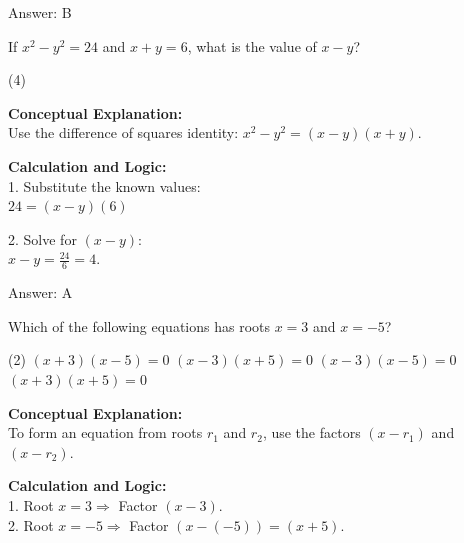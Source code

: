 \documentclass[11pt,paper=a4,answers]{exam}
\begin{document}
\begin{questions}
\begin{solution}
\vspace{20pt}

Answer: \colorbox{yellow!100}{B}
\end{solution}

\vspace{30pt}

\question
If $x^2 - y^2 = 24$ and $x + y = 6$, what is the value of $x - y$?
\begin{tasks}(4)
\end{tasks}

\begin{solution}
\textbf{Conceptual Explanation:} \\
Use the difference of squares identity: $x^2 - y^2 = (x - y)(x + y)$.

\vspace{15pt}

\textbf{Calculation and Logic:} \\
1. Substitute the known values: \\
   $24 = (x - y)(6)$

\vspace{10pt}

2. Solve for $(x - y)$: \\
   $x - y = \frac{24}{6} = 4$.

\vspace{20pt}

Answer: \colorbox{yellow!100}{A}
\end{solution}

\vspace{30pt}

\question
Which of the following equations has roots $x = 3$ and $x = -5$?
\begin{tasks}(2)
    \task $(x + 3)(x - 5) = 0$
    \task $(x - 3)(x + 5) = 0$
    \task $(x - 3)(x - 5) = 0$
    \task $(x + 3)(x + 5) = 0$
\end{tasks}

\begin{solution}
\textbf{Conceptual Explanation:} \\
To form an equation from roots $r_1$ and $r_2$, use the factors $(x - r_1)$ and $(x - r_2)$.

\vspace{15pt}

\textbf{Calculation and Logic:} \\
1. Root $x = 3 \Rightarrow$ Factor $(x - 3)$. \\
2. Root $x = -5 \Rightarrow$ Factor $(x - (-5)) = (x + 5)$.


\end{solution}
\end{questions}
\end{document}

